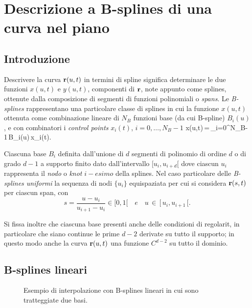 \chapter{Descrizione a B-splines di una curva nel piano}

\section{Introduzione}

Descrivere la curva ${\bf r}(u,t)$ in termini di spline significa determinare le due funzioni
$x(u,t)$ e $y(u,t)$, componenti di ${\bf r}$, note appunto come splines, ottenute dalla
composizione di segmenti di funzioni polinomiali o {\it spans}.
Le {\it B-splines} rappresentano una particolare classe di splines in cui la funzione 
$x(u,t)$ \e ottenuta come combinazione lineare di $N_B$ funzioni base (da cui B-spline)
$B_i(u)$, e con combinatori i {\it control points} $x_i(t)$, $i=0,\dots,N_B-1$
\be
x(u,t)\,=\,\sum_{i=0}^{N_B-1}\,B_i(u)\,x_i(t).
\ee
   
Ciascuna base $B_i$ \e definita dall'unione di $d$ segmenti di polinomio di ordine $d$ 
o di grado $d-1$ a supporto finito dato dall'intervallo $[u_i,u_{i+d}[$
dove ciascun $u_i$ rappresenta il {\it nodo} o {\it knot} $i-esimo$ della splines.  
Nel caso particolare delle {\it B-splines uniformi} la sequenza di nodi $\{u_i\}$ \e
equispaziata per cui si considera ${\bf r}(s,t)$ per ciascun span, con 
$$
s=\frac{u-u_i}{u_{i+1}-u_i}\in [0,1[ \quad e \quad u\,\in\,[\,u_i,u_{i+1}\,[.
$$

Si fissa inoltre che ciascuna base presenti anche delle condizioni di regolarit\a, in
particolare che siano continue le prime $d-2$ derivate su tutto il supporto;
in questo modo anche la curva ${\bf r}(u,t)$ \e una funzione $C^{d-2}$ su tutto il dominio.

\section{B-splines lineari}

\begin{figure}[tbp]
 \centerline{
  }
 \caption[B-spline lineari]
  {Esempio di interpolazione con B-splines lineari in cui sono tratteggiate due basi.}
\end{figure}

